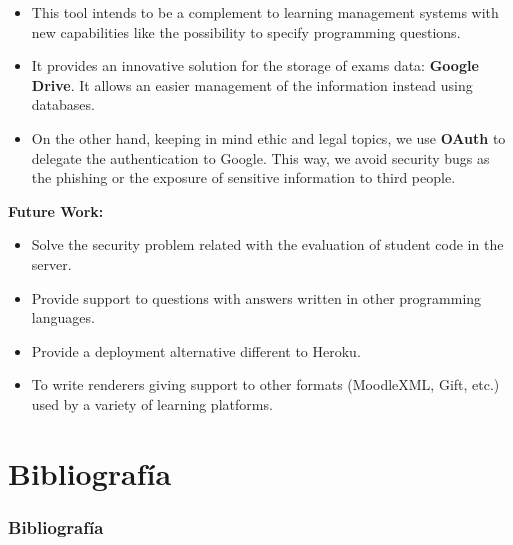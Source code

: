 \documentclass{beamer}
\begin{document}
\begin{frame}[allowframebreaks]
  \begin{itemize}
    \item This tool intends to be a complement to learning management systems with new capabilities like the possibility to specify 
    programming questions.
    \item It provides an innovative solution for the storage of exams data: {\bfseries Google Drive}.
    It allows an easier management of the information instead using databases.
    \item On the other hand, keeping in mind ethic and legal topics, we use {\bfseries OAuth} to delegate the authentication to Google. 
    This way, we avoid security bugs as the phishing or the exposure of sensitive information to third people.
  \end{itemize}
  \framebreak
  
{\bf Future Work:}
  \begin{itemize}
    \item Solve the security problem related with the evaluation of student code in the server.
    \item Provide support to questions with answers written in other programming languages.
    \item Provide a deployment alternative different to Heroku.
    \item To write renderers giving support to other formats (MoodleXML, Gift, etc.) used by a variety of learning platforms.
  \end{itemize}
\end{frame}


\section{Bibliografía}
\begin{frame}[allowframebreaks]
  \frametitle{Bibliografía}
  
  
  \nocite{*}
\end{frame}
\end{document}
